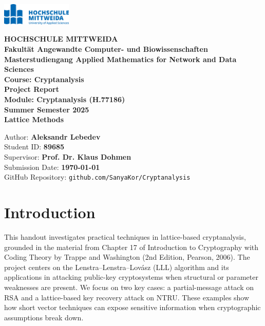 \documentclass[a4paper,12pt]{article}
\begin{document}
\begin{titlepage}
    \begin{center}
        \includegraphics[width=0.25\textwidth]{Logo-hsmw.png}\\[0.5cm]

        \Large %
            
        \textbf{HOCHSCHULE MITTWEIDA}\\[0.5cm]
        \textbf{Fakultät Angewandte Computer- und Biowissenschaften}\\[0.3cm]
        \textbf{Masterstudiengang Applied Mathematics for Network and Data Sciences}\\[1.5cm]
        
        \Large
        \textbf{Course: Cryptanalysis}\\[0.5cm]
        \textbf{Project Report}\\[1.5cm]
        \textbf{Module: Cryptanalysis (H.77186)}\\[0.2cm]
        \textbf{Summer Semester 2025}\\[1.5cm]
        
        \Huge
        \textbf{Lattice Methods}\\[2cm]
        
        \normalsize
        \begin{tabbing}
        Author: \textbf{Aleksandr Lebedev}\\
        Student ID: \textbf{89685}\\
        Supervisor: \textbf{Prof. Dr. Klaus Dohmen}\\
		Submission Date: \textbf{\today} \\
    	GitHub Repository:  \texttt{github.com/SanyaKor/Cryptanalysis}
        \end{tabbing}

        \vfill
        
    \end{center}
\end{titlepage}

\tableofcontents
\newpage

\section{Introduction}
This handout investigates practical techniques in lattice-based cryptanalysis, grounded in the material from Chapter 17 of Introduction to Cryptography with Coding Theory by Trappe and Washington (2nd Edition, Pearson, 2006). The project centers on the Lenstra–Lenstra–Lovász (LLL) algorithm and its applications in attacking public-key cryptosystems when structural or parameter weaknesses are present. We focus on two key cases: a partial-message attack on RSA and a lattice-based key recovery attack on NTRU. These examples show how short vector techniques can expose sensitive information when cryptographic assumptions break down.
\end{document}

